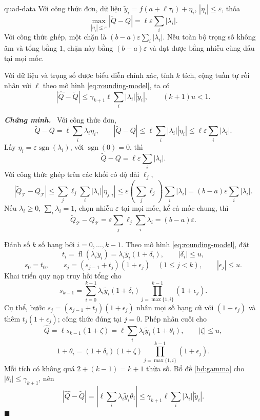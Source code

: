 \documentclass[12pt,a4paper,oneside]{book}
\numberwithin{algorithm}{chapter}
\theoremstyle{definition}
\newenvironment{chungminh}{\par\medskip\noindent\textbf{\textit{\color{mainblue}Chứng minh.}}\ }{\hfill$\blacksquare$\par\medskip}
\begin{document}
\begin{menhde}{}{quad-data}
Với công thức đơn, dữ liệu $\widetilde y_i=f(a+\ell\tau_i)+\eta_i$, $|\eta_i|\leq\varepsilon$, thỏa
\[
 \max_{|\eta_i|\leq\varepsilon}|\widetilde Q-Q|=\ell\varepsilon\sum_i|\lambda_i|.
\]
Với công thức ghép, một chặn là $(b-a)\varepsilon\sum_i|\lambda_i|$. Nếu toàn bộ trọng số không âm và tổng bằng $1$, chặn này bằng $(b-a)\varepsilon$ và đạt được bằng nhiễu cùng dấu tại mọi mốc.

Với dữ liệu và trọng số được biểu diễn chính xác, tính $k$ tích, cộng tuần tự rồi nhân với $\ell$ theo mô hình \eqref{eq:rounding-model}, ta có
\[
 |\widehat Q-\widetilde Q|\leq\gamma_{k+1}\ell\sum_i|\lambda_i||\widetilde y_i|,
 \qquad (k+1)u<1.
\]
\end{menhde}
\begin{chungminh}
Với công thức đơn,
\[
 \widetilde Q-Q=\ell\sum_i\lambda_i\eta_i,\qquad
 |\widetilde Q-Q|\leq\ell\sum_i|\lambda_i||\eta_i|
 \leq\ell\varepsilon\sum_i|\lambda_i|.
\]
Lấy $\eta_i=\varepsilon\operatorname{sgn}(\lambda_i)$, với $\operatorname{sgn}(0)=0$, thì
\[
 \widetilde Q-Q=\ell\varepsilon\sum_i|\lambda_i|.
\]
Với công thức ghép trên các khối có độ dài $\ell_j$,
\[
 |\widetilde Q_{\mathcal T}-Q_{\mathcal T}|
 \leq\sum_j\ell_j\sum_i|\lambda_i||\eta_{j,i}|
 \leq\varepsilon\left(\sum_j\ell_j\right)\sum_i|\lambda_i|
 =(b-a)\varepsilon\sum_i|\lambda_i|.
\]
Nếu $\lambda_i\geq0$, $\sum_i\lambda_i=1$, chọn nhiễu $\varepsilon$ tại mọi mốc, kể cả mốc chung, thì
\[
 \widetilde Q_{\mathcal T}-Q_{\mathcal T}
 =\varepsilon\sum_j\ell_j\sum_i\lambda_i=(b-a)\varepsilon.
\]

Đánh số $k$ số hạng bởi $i=0,\ldots,k-1$. Theo mô hình \eqref{eq:rounding-model}, đặt
\[
 t_i=\operatorname{fl}(\lambda_i\widetilde y_i)
 =\lambda_i\widetilde y_i(1+\delta_i),\qquad |\delta_i|\leq u,
\]
\[
 s_0=t_0,\qquad s_j=(s_{j-1}+t_j)(1+\epsilon_j)
 \quad(1\leq j<k),\qquad |\epsilon_j|\leq u.
\]
Khai triển quy nạp truy hồi tổng cho
\[
 s_{k-1}=\sum_{i=0}^{k-1}\lambda_i\widetilde y_i(1+\delta_i)
 \prod_{j=\max\{1,i\}}^{k-1}(1+\epsilon_j).
\]
Cụ thể, bước $s_j=(s_{j-1}+t_j)(1+\epsilon_j)$ nhân mọi số hạng cũ với $(1+\epsilon_j)$ và thêm $t_j(1+\epsilon_j)$; công thức đúng tại $j=0$. Phép nhân cuối cho
\[
 \widehat Q=\ell s_{k-1}(1+\zeta)
 =\ell\sum_i\lambda_i\widetilde y_i(1+\theta_i),\qquad |\zeta|\leq u,
\]
\[
 1+\theta_i=(1+\delta_i)(1+\zeta)
 \prod_{j=\max\{1,i\}}^{k-1}(1+\epsilon_j).
\]
Mỗi tích có không quá $2+(k-1)=k+1$ thừa số. Bổ đề \ref{bd:gamma} cho $|\theta_i|\leq\gamma_{k+1}$, nên
\[
 |\widehat Q-\widetilde Q|
 =\left|\ell\sum_i\lambda_i\widetilde y_i\theta_i\right|
 \leq\gamma_{k+1}\ell\sum_i|\lambda_i||\widetilde y_i|.
\]
\end{chungminh}
\end{document}
